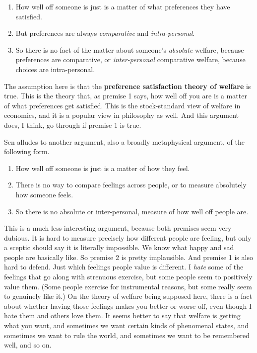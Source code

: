 \begin{enumerate}
\item{} How well off someone is just is a matter of what preferences they have satisfied.

\item{} But preferences are always \emph{comparative} and \emph{intra-personal}.

\item{} So there is no fact of the matter about someone's \emph{absolute} welfare, because preferences are comparative, or \emph{inter-personal} comparative welfare, because choices are intra-personal.

\end{enumerate}
The assumption here is that the \textbf{preference satisfaction theory of welfare} is true. This is the theory that, as premise 1 says, how well off you are is a matter of what preferences get satisfied. This is the stock-standard view of welfare in economics, and it is a popular view in philosophy as well. And this argument does, I think, go through if premise 1 is true.

Sen alludes to another argument, also a broadly metaphysical argument, of the following form.

\begin{enumerate}
\item{} How well off someone is just is a matter of how they feel.

\item{} There is no way to compare feelings across people, or to measure absolutely how someone feels.

\item{} So there is no absolute or inter-personal, measure of how well off people are.

\end{enumerate}
This is a much less interesting argument, because both premises seem very dubious. It is hard to measure precisely how different people are feeling, but only a sceptic should say it is literally impossible. We know what happy and sad people are basically like. So premise 2 is pretty implausible. And premise 1 is also hard to defend. Just which feelings people value is different. I \emph{hate} some of the feelings that go along with strenuous exercise, but some people seem to positively value them. (Some people exercise for instrumental reasons, but some really seem to genuinely like it.) On the theory of welfare being supposed here, there is a fact about whether having those feelings makes you better or worse off, even though I hate them and others love them. It seems better to say that welfare is getting what you want, and sometimes we want certain kinds of phenomenal states, and sometimes we want to rule the world, and sometimes we want to be remembered well, and so on.

